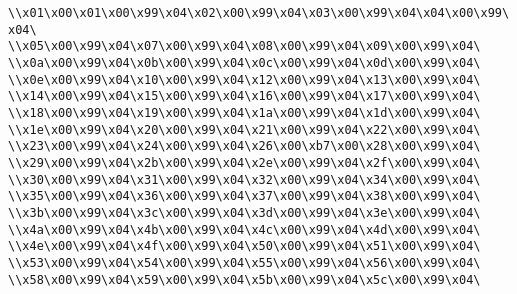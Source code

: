 \verb|\\x01\x00\x01\x00\x99\x04\x02\x00\x99\x04\x03\x00\x99\x04\x04\x00\x99\x04\|\newline
\verb|\\x05\x00\x99\x04\x07\x00\x99\x04\x08\x00\x99\x04\x09\x00\x99\x04\|\newline
\verb|\\x0a\x00\x99\x04\x0b\x00\x99\x04\x0c\x00\x99\x04\x0d\x00\x99\x04\|\newline
\verb|\\x0e\x00\x99\x04\x10\x00\x99\x04\x12\x00\x99\x04\x13\x00\x99\x04\|\newline
\verb|\\x14\x00\x99\x04\x15\x00\x99\x04\x16\x00\x99\x04\x17\x00\x99\x04\|\newline
\verb|\\x18\x00\x99\x04\x19\x00\x99\x04\x1a\x00\x99\x04\x1d\x00\x99\x04\|\newline
\verb|\\x1e\x00\x99\x04\x20\x00\x99\x04\x21\x00\x99\x04\x22\x00\x99\x04\|\newline
\verb|\\x23\x00\x99\x04\x24\x00\x99\x04\x26\x00\xb7\x00\x28\x00\x99\x04\|\newline
\verb|\\x29\x00\x99\x04\x2b\x00\x99\x04\x2e\x00\x99\x04\x2f\x00\x99\x04\|\newline
\verb|\\x30\x00\x99\x04\x31\x00\x99\x04\x32\x00\x99\x04\x34\x00\x99\x04\|\newline
\verb|\\x35\x00\x99\x04\x36\x00\x99\x04\x37\x00\x99\x04\x38\x00\x99\x04\|\newline
\verb|\\x3b\x00\x99\x04\x3c\x00\x99\x04\x3d\x00\x99\x04\x3e\x00\x99\x04\|\newline
\verb|\\x4a\x00\x99\x04\x4b\x00\x99\x04\x4c\x00\x99\x04\x4d\x00\x99\x04\|\newline
\verb|\\x4e\x00\x99\x04\x4f\x00\x99\x04\x50\x00\x99\x04\x51\x00\x99\x04\|\newline
\verb|\\x53\x00\x99\x04\x54\x00\x99\x04\x55\x00\x99\x04\x56\x00\x99\x04\|\newline
\verb|\\x58\x00\x99\x04\x59\x00\x99\x04\x5b\x00\x99\x04\x5c\x00\x99\x04\|\newline

